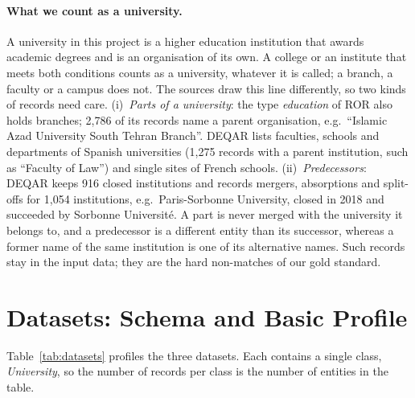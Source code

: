 \documentclass[runningheads,a4paper]{llncs}
\begin{document}
\paragraph{What we count as a university.}
A university in this project is a higher education institution that awards academic degrees and
is an organisation of its own. A college or an institute that meets both conditions counts as a
university, whatever it is called; a branch, a faculty or a campus does not. The sources draw
this line differently, so two kinds of records need care. (i)~\emph{Parts of a university}: the
type \emph{education} of ROR also holds branches; 2,786 of its records name a parent
organisation, e.g.\ ``Islamic Azad University South Tehran Branch''. DEQAR lists faculties,
schools and departments
of Spanish universities (1,275 records with a parent institution, such as ``Faculty of Law'')
and single sites of French schools.
(ii)~\emph{Predecessors}: DEQAR keeps 916 closed institutions and records mergers, absorptions
and split-offs for 1,054 institutions, e.g.\ Paris-Sorbonne University, closed in 2018 and
succeeded by Sorbonne Universit\'e. A part is never merged with the university it belongs to,
and a predecessor is a different entity than its successor, whereas a former name of the same
institution is one of its alternative names. Such records stay in the input data; they are the
hard non-matches of our gold standard.

\section{Datasets: Schema and Basic Profile}

Table~\ref{tab:datasets} profiles the three datasets. Each contains a single class,
\emph{University}, so the number of records per class is the number of entities in the table.
\end{document}
